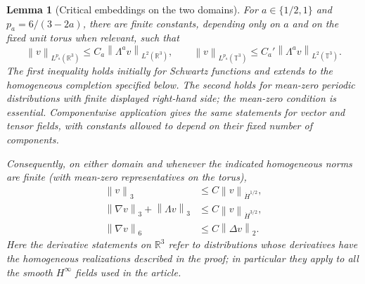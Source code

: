 \documentclass[11pt,a4paper]{article}
\newtheorem{lemma}[theorem]{Lemma}
\theoremstyle{definition}\newtheorem{definition}[theorem]{Definition}
\theoremstyle{remark}\newtheorem{remark}[theorem]{Remark}
\newcommand{\R}{\mathbb R}\newcommand{\TT}{\mathbb T^3}
\newcommand{\norm}[1]{\left\lVert#1\right\rVert}
\begin{document}
\begin{lemma}[Critical embeddings on the two domains]\label{lem:critical-embeddings}
For $a\in\{1/2,1\}$ and $p_a=6/(3-2a)$, there are finite constants,
depending only on $a$ and on the fixed unit torus when relevant, such that
\begin{equation}\label{eq:critical-embedding-pair}
 \norm{v}_{L^{p_a}(\R^3)}\le C_a\norm{\Lambda^a v}_{L^2(\R^3)},
 \qquad
 \norm{v}_{L^{p_a}(\TT)}\le C_a'\norm{\Lambda^a v}_{L^2(\TT)}.
\end{equation}
The first inequality holds initially for Schwartz functions and extends
to the homogeneous completion specified below.  The second holds for
mean-zero periodic distributions with finite displayed right-hand side;
the mean-zero condition is essential.  Componentwise application gives
the same statements for vector and tensor fields, with constants allowed
to depend on their fixed number of components.

Consequently, on either domain and whenever the indicated homogeneous
norms are finite (with mean-zero representatives on the torus),
\begin{align}
 \norm{v}_3&\le C\norm{v}_{\dot H^{1/2}},\nonumber\\
 \norm{\nabla v}_3+\norm{\Lambda v}_3
   &\le C\norm{v}_{\dot H^{3/2}},\label{eq:critical-derived}\\
 \norm{\nabla v}_6&\le C\norm{\Delta v}_2.\nonumber
\end{align}
Here the derivative statements on $\R^3$ refer to distributions whose
derivatives have the homogeneous realizations described in the proof;
in particular they apply to all the smooth $H^\infty$ fields used in
the article.
\end{lemma}
\end{document}
